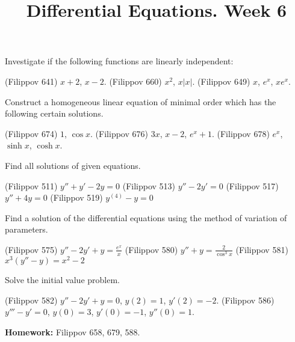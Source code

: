 \documentclass[14pt]{exam}
\title{Differential Equations. Week 6}
\date{}
\begin{document}
	\maketitle
	
	Investigate if the following functions are linearly independent:
	
	\begin{questions}
		\question (Filippov 641) $x+2$, $x-2$.
		\question (Filippov 660) $x^2$, $x|x|$.
		\question (Filippov 649) $x$, $e^x$, $xe^x$.
	\end{questions}
	
	Construct a homogeneous linear equation of minimal order which has the following certain solutions.
	
	\begin{questions}
		\setcounter{question}{3}
		\question (Filippov 674) $1$, $\cos x$.
		\question (Filippov 676) $3x$, $x-2$, $e^x + 1$.
		\question (Filippov 678) $e^x$, $\sinh x$, $\cosh x$.
	\end{questions}
	
	Find all solutions of given equations.
	
	\begin{questions}
		\setcounter{question}{6}
		\question (Filippov 511) $y'' + y' - 2y = 0$
		\question (Filippov 513) $y'' - 2y' = 0$
		\question (Filippov 517) $y'' + 4y = 0$
		\question (Filippov 519) $y^{(4)} - y = 0$
	\end{questions}
	
	Find a solution of the differential equations using the method of variation of parameters.
	
	\begin{questions}
		\setcounter{question}{10}
		\question (Filippov 575) $y'' -2 y' + y = \frac{e^x}{x}$
		\question (Filippov 580) $y'' + y = \frac{2}{\cos^3 x}$
		\question (Filippov 581) $x^3 (y'' - y) = x^2 - 2$
	\end{questions}
	
	Solve the initial value problem.
	\begin{questions}
		\setcounter{question}{13}
		\question (Filippov 582) $y'' - 2y' + y = 0$, $y(2) = 1$, $y'(2) = -2$.
		\question (Filippov 586) $y''' - y' = 0$, $y(0) = 3$, $y'(0) = -1$, $y''(0) = 1$.
	\end{questions}
	\textbf{Homework:} Filippov 658, 679, 588.
\end{document}
